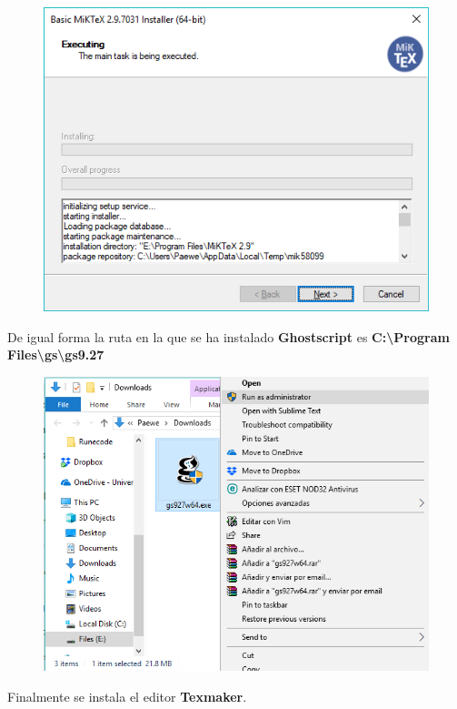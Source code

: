 \documentclass{article}
\begin{document}
\begin{figure}[h!]
  \centering
  \includegraphics[scale=0.75]{./imagenes/Install_Miktex6.png}
\end{figure}
\clearpage

De igual forma la ruta en la que se ha instalado \textbf{Ghostscript} es
\textbf{C:{\textbackslash}Program Files{\textbackslash}gs{\textbackslash}gs9.27}

\begin{figure}[h!]
  \centering
  \includegraphics[scale=0.75]{./imagenes/Install_ghostscript2.png}
\end{figure}

Finalmente se instala el editor \textbf{Texmaker}.
\end{document}
